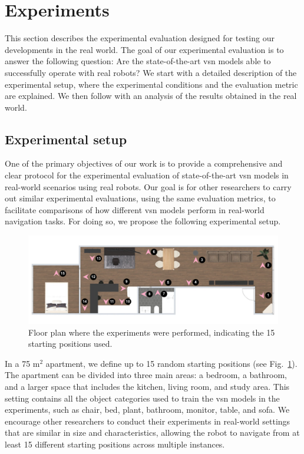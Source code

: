 \section{Experiments}\label{sec:experiments}
This section describes the experimental evaluation designed for testing our developments in the real world.
The goal of our experimental evaluation is to answer the following question: Are the state-of-the-art \acrshort{vsn} models able to successfully operate with real robots?
We start with a detailed description of the experimental setup, where the experimental conditions and the evaluation metric are explained.
We then follow with an analysis of the results obtained in the real world.

\subsection{Experimental setup}
\label{subsec:experimental_setup}

One of the primary objectives of our work is to provide a comprehensive and clear protocol for the experimental evaluation of state-of-the-art \acrshort{vsn} models in real-world scenarios using real robots.
Our goal is for other researchers to carry out similar experimental evaluations, using the same evaluation metrics, to facilitate comparisons of how different \acrshort{vsn} models perform in real-world navigation tasks.
For doing so, we propose the following experimental setup.

\begin{figure}[t]
    \centering
        \includegraphics[width=\linewidth]{figures/ros4vsn/plano_vivienda}
        \caption{Floor plan where the experiments were performed, indicating the 15 starting positions used.}
        \label{fig:floor_plan}
\end{figure}

In a 75 m$^2$ apartment, we define up to 15 random starting positions (see Fig.~\ref{fig:floor_plan}).
The apartment can be divided into three main areas: a bedroom, a bathroom, and a larger space that includes the kitchen, living room, and study area.
This setting contains all the object categories used to train the \acrshort{vsn} models in the experiments, such as chair, bed, plant, bathroom, monitor, table, and sofa.
We encourage other researchers to conduct their experiments in real-world settings that are similar in size and characteristics, allowing the robot to navigate from at least 15 different starting positions across multiple instances.

